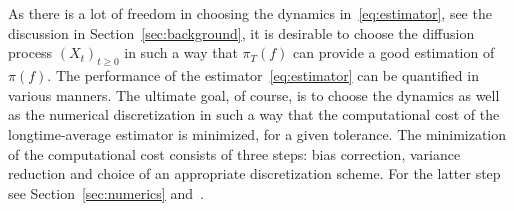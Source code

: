 \\\\
As there is a lot of freedom in choosing the dynamics in~\eqref{eq:estimator}, see the discussion in Section~\ref{sec:background}, it is desirable to choose the diffusion process $(X_t)_{t\ge0}$ in such a way that $\pi_T(f)$ can provide a good estimation of $\pi(f)$. The performance of the estimator~\eqref{eq:estimator} can be quantified in various manners. The ultimate goal, of course, is to choose the dynamics as well as the numerical discretization in such a way that the computational cost of the longtime-average estimator is minimized, for a given tolerance. The minimization of the computational cost consists of three steps: bias correction, variance reduction and choice of an appropriate discretization scheme. For the latter step see Section~\ref{sec:numerics} and~\cite[Sec. 6]{duncan2016variance}. 

